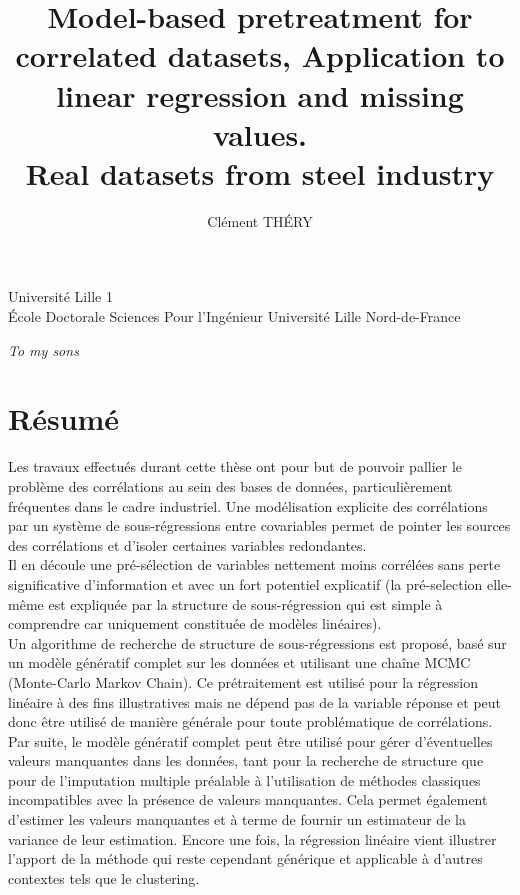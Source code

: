 \documentclass[12pt,a4paper]{report}
\author{Clément TH\'ERY}
\title{Model-based pretreatment for correlated datasets, Application to linear regression and missing values. \\ Real datasets from steel industry}
\begin{document}
	Université Lille 1 \\
	\'Ecole Doctorale Sciences Pour l'Ingénieur Université Lille Nord-de-France
	
\maketitle

\newpage
\itshape To my sons
\upshape


\chapter*{Résumé}
	Les travaux effectués durant cette thèse ont pour but de pouvoir pallier le problème des corrélations au sein des bases de données, particulièrement fréquentes dans le cadre industriel. Une modélisation explicite des corrélations par un système de sous-régressions entre covariables permet de pointer les sources des corrélations et d'isoler certaines variables redondantes. 
	\\
	
	Il en découle une pré-sélection de variables nettement moins corrélées sans perte significative d'information et avec un fort potentiel explicatif (la pré-selection elle-même est expliquée par la structure de sous-régression qui est simple à comprendre car uniquement constituée de modèles linéaires). \\
	
	Un algorithme de recherche de structure de sous-régressions est proposé, basé sur un modèle génératif complet sur les données et utilisant une chaîne MCMC (Monte-Carlo Markov Chain). Ce prétraitement est utilisé pour la régression linéaire à des fins illustratives mais ne dépend pas de la variable réponse et peut donc être utilisé de manière générale pour toute problématique de corrélations.\\
	
	Par suite, le modèle génératif complet peut être utilisé pour gérer d'éventuelles valeurs manquantes dans les données, tant pour la recherche de structure que pour de l'imputation multiple préalable à l'utilisation de méthodes classiques incompatibles avec la présence de valeurs manquantes. Cela permet également d'estimer les valeurs manquantes et à terme  de fournir un estimateur de la variance de leur estimation.
	Encore une fois, la régression linéaire vient illustrer l'apport de la méthode qui reste cependant générique et applicable à d'autres contextes tels que le clustering.
	\\
	
\end{document}
